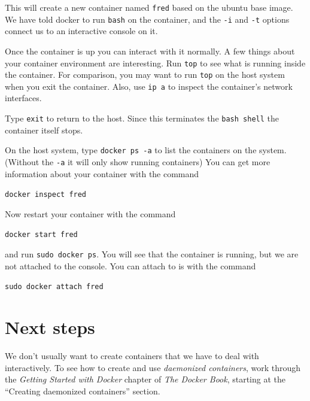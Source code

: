 \documentclass{article}
\begin{document}
This will create a new container named \texttt{fred} based on the ubuntu base image. We have told docker to run \texttt{bash} on the container, and the \texttt{-i} and \texttt{-t} options connect us to an interactive console on it.  

Once the container is up you can interact with it normally.  A few things about your container environment are interesting. Run \texttt{top} to see what is running inside the container.  For comparison, you may want to run \texttt{top} on the host system when you exit the container.  Also, use \texttt{ip a} to inspect the container's network interfaces.

Type \texttt{exit} to return to the host. Since this terminates the \texttt{bash shell} the container itself stops.

On the host system, type \texttt{docker ps -a} to list the containers on the system. (Without the \texttt{-a} it will only show running containers) You can get more information about your container with the command

\texttt{docker inspect fred}

Now restart your container with the command 

\texttt{docker start fred}

and run \texttt{sudo docker ps}.  You will see that the container is running, but we are not attached to the console.  You can attach to is with the command

\texttt{sudo docker attach fred}

\section{Next steps}
We don't usually want to create containers that we have to deal with interactively.  To see how to create and use \emph{daemonized containers}, work through the \emph{Getting Started with Docker} chapter of \emph{The Docker Book}, starting at the ``Creating daemonized containers'' section.
\end{document}
